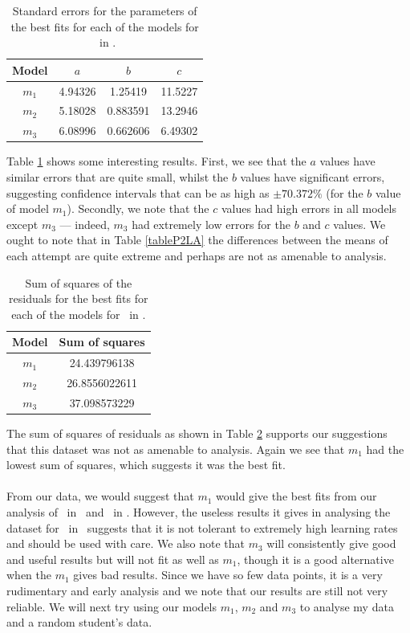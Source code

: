 \begin{table}[ht!]
\centering
\begin{tabular}{|c|c|c|c|}
\hline
{\bf Model} &  $a$ & $b$ & $c$ \\
\hline
$m_1$ & 4.94326 & 1.25419 & 11.5227 \\
\hline
$m_2$ & 5.18028 & 0.883591 & 13.2946 \\
\hline
$m_3$ & 6.08996 & 0.662606 & 6.49302 \\
\hline
\end{tabular}
\caption{Standard errors for the parameters of the best fits for each of the models for \PT\ in \LA.}
\label{table:P2LA:abc:error}
\end{table}

Table \ref{table:P2LA:abc:error} shows some interesting results.
First, we see that the $a$ values have similar errors that are quite small,
whilst the $b$ values have significant errors, suggesting confidence intervals
that can be as high as $\pm 70.372\%$ (for the $b$ value of model $m_1$).
Secondly, we note that the $c$ values had high errors in all models except $m_3$
--- indeed, $m_3$ had extremely low errors for the $b$ and $c$ values.
We ought to note that in Table \ref{tableP2LA} the differences between the means
of each attempt are quite extreme and perhaps are not as amenable to analysis.

\begin{table}[ht!]
\centering
\begin{tabular}{|c|c|}
\hline
{\bf Model} & Sum of squares \\
\hline
$m_1$ & 24.439796138\\
\hline
$m_2$ & 26.8556022611\\
\hline
$m_3$ & 37.098573229\\
\hline
\end{tabular}
\caption{Sum of squares of the residuals for the best fits for each of the models for \PT\ in \LA.}
\label{table:P2LA:abc:sumsquares}
\end{table}

The sum of squares of residuals as shown in Table \ref{table:P2LA:abc:sumsquares}
supports our suggestions that this dataset was not as amenable to analysis.
Again we see that $m_1$ had the lowest sum of squares, which suggests it was the
best fit.\\
\\
From our data, we would suggest that $m_1$ would give the best fits from our analysis of \PT\
in \LA\ and \PO\ in \LB.
However, the useless results it gives in analysing the dataset for \PO\ in \LA\
suggests that it is not tolerant to extremely high learning rates and should be
used with care.
We also note that $m_3$ will consistently give good and useful results but will
not fit as well as $m_1$, though it is a good alternative when the $m_1$ gives
bad results.
Since we have so few data points, it is a very rudimentary and early analysis
and we note that our results are still not very reliable.
We will next try using our models $m_1$, $m_2$ and $m_3$ to analyse my data and
a random student's data.

